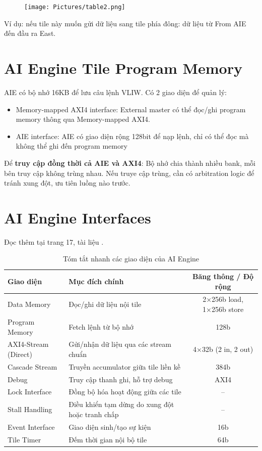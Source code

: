 \begin{figure}[H]
    \centering
    \texttt{[image: Pictures/table2.png]}

    \label{fig:enter-label}
\end{figure}
Ví dụ: nếu tile này muốn gửi dữ liệu sang tile phía đông: dữ liệu từ From AIE đến đầu ra East.

\section{AI Engine Tile Program Memory\cite{amdAM009}}
AIE có bộ nhớ 16KB để lưu câu lệnh VLIW. Có 2 giao diện để quản lý: 
\begin{itemize}
    \item Memory-mapped AXI4 interface: External master có thể đọc/ghi program memory thông qua Memory-mapped AXI4. 
    \item AIE interface:  AIE có giao diện rộng 128bit để nạp lệnh, chỉ có thể đọc mà không thể ghi đến program memory 
\end{itemize}
Để \textbf{truy cập đồng thời cả AIE và AXI4}: Bộ nhớ chia thành nhiều bank, mỗi bên truy cập không trùng nhau. Nếu truye cập trùng, cần có arbitration logic để tránh xung đột, ưu tiên luồng nào trước.

\section{AI Engine Interfaces}
Đọc thêm tại trang 17, tài liệu \cite{amdAM009}.
\begin{table}[h!]
\centering
\caption{Tóm tắt nhanh các giao diện của AI Engine}
\begin{tabular}{l l c}
\hline
\textbf{Giao diện} & \textbf{Mục đích chính} & \textbf{Băng thông / Độ rộng} \\
\hline
Data Memory & Đọc/ghi dữ liệu nội tile & 2×256b load, 1×256b store \\
\hline
Program Memory & Fetch lệnh từ bộ nhớ & 128b \\
\hline
AXI4-Stream (Direct) & Gửi/nhận dữ liệu qua các stream chuẩn & 4×32b (2 in, 2 out) \\
\hline
Cascade Stream & Truyền accumulator giữa tile liền kề & 384b \\
\hline
Debug & Truy cập thanh ghi, hỗ trợ debug & AXI4 \\
\hline
Lock Interface & Đồng bộ hóa hoạt động giữa các tile & -- \\
\hline
Stall Handling & Điều khiển tạm dừng do xung đột hoặc tranh chấp & -- \\
\hline
Event Interface & Giao diện sinh/tạo sự kiện & 16b \\
\hline
Tile Timer & Đếm thời gian nội bộ tile & 64b \\
\hline
\end{tabular}
\end{table}


